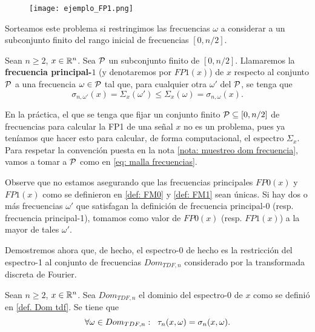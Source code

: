 \begin{figure}[H]
	\centering
	\texttt{[image: ejemplo\_FP1.png]} 
\end{figure}	
Sorteamos este problema si restringimos las frecuencias
$\omega$ a considerar a un subconjunto finito del
rango inicial de frecuencias
$[0, n/2]$.

\begin{defi}
	\label{def: FM1}
	Sean $n \geq 2$, $x \in \mathbb{R}^{n}$. Sea
	$\mathcal{P}$ un subconjunto finito
	de $[0, n/2]$.
	Llamaremos la \textbf{frecuencia principal-$1$}
	(y denotaremos
	por $FP1(x)$) 
	de $x$ respecto al conjunto $\mathcal{P}$	
	a una frecuencia $\omega \in \mathcal{P}$ 
	tal que, para cualquier otra $\omega'$ del $\mathcal{P}$, se tenga que
	\[
	\sigma_{n, \omega'}(x) = \Sigma_{x}(\omega') 
	\leq \Sigma_{x}(\omega) = \sigma_{n, \omega}(x).
	\]
\end{defi}
En la práctica, el que se tenga que fijar un conjunto
finito $\mathcal{P} \subseteq [0, n/2]$ de frecuencias
para calcular la FP1 de una
señal $x$ no es un problema, pues ya teníamos que hacer
esto para calcular, de forma computacional, el espectro
$\Sigma_{x}$. Para respetar la convención
puesta en la nota 
\ref{nota: muestreo dom frecuencia}, vamos
a tomar a $\mathcal{P}$ como en 
\eqref{eq: malla frecuencias}.
	
\begin{nota}
Observe que no estamos asegurando
que las frecuencias principales
$FP0(x)$ y $FP1(x)$ como se definieron en 
\ref{def: FM0} y \ref{def: FM1}
sean únicas.
Si hay dos o más frecuencias $\omega'$ que satisfagan
la definición de frecuencia principal-0 
(resp. frecuencia principal-1), tomamos
como valor de $FP0(x)$ 
(resp. $FP1(x)$)
a la mayor de tales $\omega'$.
\end{nota}


Demostremos ahora que, de hecho, el espectro-0
de hecho es la restricción del espectro-1
al conjunto de frecuencias 
$Dom_{TDF, n}$ considerado por la transformada discreta
de Fourier.
\begin{prop}
\label{prop: coinciden espectr}
Sean $n \geq 2$, $x \in \mathbb{R}^{n}$.
Sea $Dom_{TDF, n}$ el dominio del espectro-0 de $x$
como se definió en \ref{def. Dom tdf}. Se tiene que
\begin{equation}
\label{eq4: 4May}
\forall \omega \in Dom_{TDF, n}:
\hspace{0.2cm} \tau_{n}(x, \omega) = \sigma_{n}(x, \omega).
\end{equation}
\end{prop}

